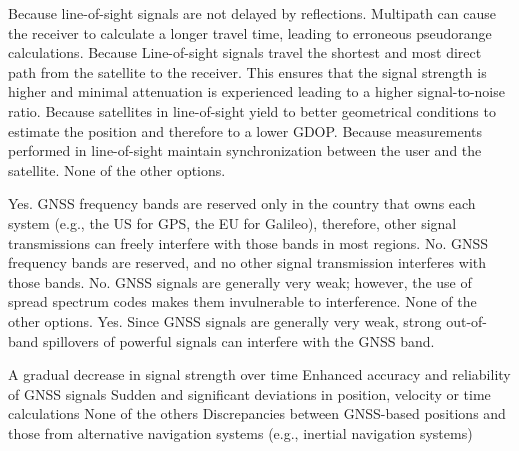 \begin{questions}
    \begin{checkboxes}
        \CorrectChoice Because line-of-sight signals are not delayed by reflections. Multipath can cause the receiver to calculate a longer travel time, leading to erroneous pseudorange calculations.
        \CorrectChoice Because Line-of-sight signals travel the shortest and most direct path from the satellite to the receiver. This ensures that the signal strength is higher and minimal attenuation is experienced leading to a higher signal-to-noise ratio.
        \choice Because satellites in line-of-sight yield to better geometrical conditions to estimate the position and therefore to a lower GDOP.
        \choice Because measurements performed in line-of-sight maintain synchronization between the user and the satellite.
        \choice None of the other options.
    \end{checkboxes}



    \begin{checkboxes}
        \choice Yes. GNSS frequency bands are reserved only in the country that owns each system (e.g., the US for GPS, the EU for Galileo), therefore, other signal transmissions can freely interfere with those bands in most regions.
        \choice No. GNSS frequency bands are reserved, and no other signal transmission interferes with those bands.
        \choice No. GNSS signals are generally very weak; however, the use of spread spectrum codes makes them invulnerable to interference.
        \choice None of the other options.
        \CorrectChoice Yes. Since GNSS signals are generally very weak, strong out-of-band spillovers of powerful signals can interfere with the GNSS band.
    \end{checkboxes}

    \begin{checkboxes}
        \choice A gradual decrease in signal strength over time
        \choice Enhanced accuracy and reliability of GNSS signals
        \choice Sudden and significant deviations in position, velocity or time calculations
        \choice None of the others
        \choice Discrepancies between GNSS-based positions and those from alternative navigation systems (e.g., inertial navigation systems)
    \end{checkboxes}



\end{questions}
